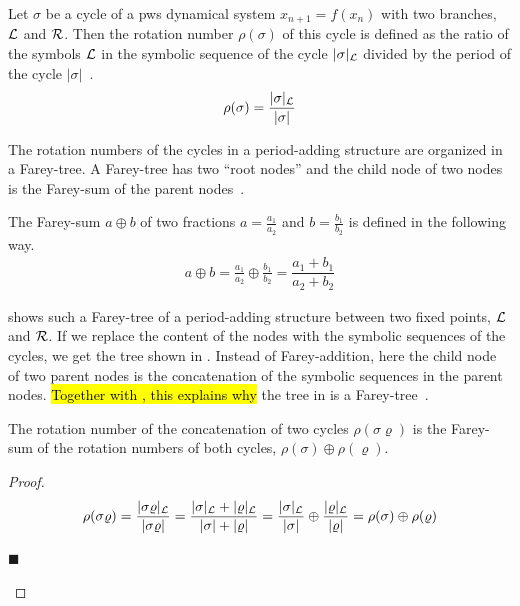 \begin{definition}
	Let $\sigma$ be a cycle of a \gls{pws} dynamical system $x_{n+1} = f(x_n)$ with two branches, $\mathcal{L}$ and $\mathcal{R}$.
	Then the rotation number $\rho(\sigma)$ of this cycle is defined as the ratio of the symbols $\mathcal{L}$ in the symbolic sequence of the cycle $|\sigma|_{\mathcal{L}}$ divided by the period of the cycle $|\sigma|$~\cite{Keener80}.
	\begin{align}
		\rho(\sigma) = \dfrac{|\sigma|_{\mathcal{L}}}{|\sigma|}
	\end{align}
\end{definition}

The rotation numbers of the cycles in a period-adding structure are organized in a Farey-tree.
A Farey-tree has two ``root nodes'' and the child node of two nodes is the Farey-sum of the parent nodes~\cite{granados14adding}.

\begin{definition}
	The Farey-sum $a \oplus b$ of two fractions $a = \frac{a_1}{a_2}$ and $b = \frac{b_1}{b_2}$ is defined in the following way.
	\begin{align}
		a \oplus b = \frac{a_1}{a_2} \oplus \frac{b_1}{b_2} = \dfrac{a_1 + b_1}{a_2 + b_2}
	\end{align}
\end{definition}

 shows such a Farey-tree of a period-adding structure between two fixed points, $\mathcal{L}$ and $\mathcal{R}$.
If we replace the content of the nodes with the symbolic sequences of the cycles, we get the tree shown in .
Instead of Farey-addition, here the child node of two parent nodes is the concatenation of the symbolic sequences in the parent nodes.
\hl{Together with , this explains why} the  tree in  is a Farey-tree~\cite{granados14adding}.

\begin{theorem}
	The rotation number of the concatenation of two cycles $\rho(\sigma\varrho)$ is the Farey-sum of the rotation numbers of both cycles, $\rho(\sigma) \oplus \rho(\varrho)$.
	\label{theorem:state.rot.num.concat}
\end{theorem}

\begin{proof}
	\begin{align*}
		\rho(\sigma\varrho)
		= \dfrac{|\sigma\varrho|_{\mathcal{L}}}{|\sigma\varrho|}
		= \dfrac{|\sigma|_{\mathcal{L}} + |\varrho|_{\mathcal{L}}}{|\sigma| + |\varrho|}
		= \dfrac{|\sigma|_{\mathcal{L}}}{|\sigma|} \oplus \dfrac{|\varrho|_{\mathcal{L}}}{|\varrho|}
		= \rho(\sigma) \oplus \rho(\varrho)
	\end{align*}
	\vspace{-4.8em}
	\begin{flushright}
		$\blacksquare$
	\end{flushright}
\end{proof}

